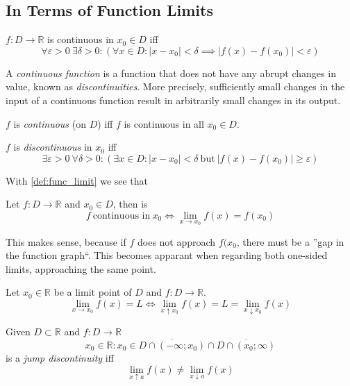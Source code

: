 \subsection{In Terms of Function Limits}
\begin{definition}\label{def:eps_delt_cont}
   \(f: D \to \mathbb{R}\) is continuous in \(x_0 \in D\) iff
   \[\forall \varepsilon > 0~\exists \delta > 0: (\forall x \in D: |x-x_0| < \delta \implies |f(x) - f(x_0)| < \varepsilon)\]
\end{definition}
\begin{remark}[Intuition]
   A \emph{continuous function} is a function that does not have any abrupt changes in value, known as \emph{discontinuities}.
   More precisely, sufficiently small changes in the input of a continuous function result in arbitrarily small changes in its output.
\end{remark}
\begin{remark}[Terminology]
   \(f\) is \emph{continuous} (on \(D\)) iff \(f\) is continuous in all \(x_0 \in D\).

   \(f\) is \emph{discontinuous} in \(x_0\) iff
   \[\exists \varepsilon > 0~\forall \delta > 0: (\exists x \in D: |x - x_0| < \delta~\text{but}~|f(x) - f(x_0)| \geq \varepsilon)\]
\end{remark}

With \cref{def:func_limit} we see that
\begin{theorem}
   Let \(f: D \to \mathbb{R}\) and \(x_0 \in D\), then is
   \[f~\text{continuous in}~x_0 \iff \lim_{x \to x_0} f(x) = f(x_0)\]
\end{theorem}

This makes sense, because if \(f\) does not approach \(f(x_0\), there must be a ''gap in the function graph``.
This becomes apparant when regarding both one-sided limits, approaching the same point.

\begin{theorem}
   Let \(x_0 \in \mathbb{R}\) be a limit point of \(D\) and \(f: D \to \mathbb{R}\).
   \[\lim_{x \to x_0} f(x) = L \iff \lim_{x \uparrow x_0} f(x) = L = \lim_{x \downarrow x_0} f(x)\]
\end{theorem}

\begin{definition}
   Given \(D \subset \mathbb{R}\) and \(f: D \to \mathbb{R}\)
   \[x_0 \in \mathbb{R}: x_0 \in \overline{D \cap (-\infty; x_0)} \cap \overline{D \cap (x_0; \infty)}\]
   is a \emph{jump discontinuity} iff
   \[\lim_{x \uparrow a} f(x) \neq \lim_{x \downarrow a} f(x)\]
\end{definition}


